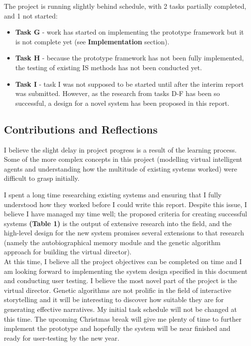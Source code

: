 \documentclass{sig-alternate-05-2015}
\begin{document}
The project is running slightly behind schedule, with 2 tasks partially completed, and 1 not started:
\begin{itemize}
	\item \textbf{Task G} - work has started on implementing the prototype framework but it is not complete yet (see \textbf{Implementation} section).
	\item \textbf{Task H} - because the prototype framework has not been fully implemented, the testing of existing IS methods has not been conducted yet.
	\item \textbf{Task I} - task I was not supposed to be started until after the interim report was submitted. However, as the research from tasks D-F has been so successful, a design for a novel system has been proposed in this report. 
\end{itemize}

\subsection{Contributions and Reflections}

I believe the slight delay in project progress is a result of the learning process. Some of the more complex concepts in this project (modelling virtual intelligent agents and understanding how the multitude of existing systems worked) were difficult to grasp initially. 

I spent a long time researching existing systems and ensuring that I fully understood how they worked before I could write this report. Despite this issue, I believe I have managed my time well; the proposed criteria for creating successful systems \textbf{(Table 1)} is the output of extensive research into the field, and the high-level design for the new system promises several extensions to that research (namely the autobiographical memory module and the genetic algorithm approach for building the virtual director).\\

At this time, I believe all the project objectives can be completed on time and I am looking forward to implementing the system design specified in this document and conducting user testing. I believe the most novel part of the project is the virtual director. Genetic algorithms are not prolific in the field of interactive storytelling and it will be interesting to discover how suitable they are for generating effective narratives. My initial task schedule will not be changed at this time. The upcoming Christmas break will give me plenty of time to further implement the prototype and hopefully the system will be near finished and ready for user-testing by the new year.
\end{document}
